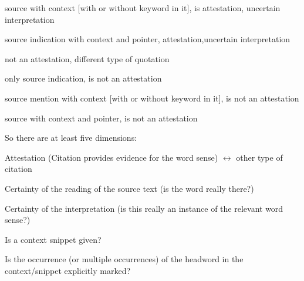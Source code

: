 \documentclass[10pt]{article}
\let\tempeone\enumerate
\let\tempetwo\endenumerate
\renewenvironment{enumerate}{\tempeone\setlength\itemsep{-0.5pt}\setlength{\partopsep}{-0.5pt}\setlength{\parsep}{-0.5pt}\setlength{\topsep}{-0.5pt}}{\tempetwo}
\begin{document}
{\begin{enumerate}
\begin{enumerate}
	\item {\fontsize{10pt}{12.0pt}\selectfont source with context [with or without keyword in it], is attestation, uncertain interpretation\par}\par

	\item {\fontsize{10pt}{12.0pt}\selectfont source indication with context and pointer, attestation,uncertain interpretation\par}\par


\end{enumerate}
	\item {\fontsize{10pt}{12.0pt}\selectfont not an attestation, different type of quotation\par}\par

\begin{enumerate}
	\item {\fontsize{10pt}{12.0pt}\selectfont only source indication, is not an attestation\par}\par

	\item {\fontsize{10pt}{12.0pt}\selectfont source mention with context [with or without keyword in it], is not an attestation\par}\par

	\item {\fontsize{10pt}{12.0pt}\selectfont [theoretically] source with context and pointer, is not an attestation\par}
\end{enumerate}
\end{enumerate}
}



\bigskip
\begin{minipage}{\textwidth}

So there are at least five dimensions:\par


\begin{enumerate}
	\item Attestation (Citation provides evidence for the word sense) $ \leftrightarrow $   other type of citation

	\item  Certainty of the reading of the source text (is the word really there?)

	\item Certainty of the interpretation (is this really an instance of the relevant word sense?)

	\item  Is a context snippet given?

    \item Is the occurrence (or multiple occurrences) of the headword in the context/snippet explicitly marked?
\end{enumerate}
\end{minipage}
\bigskip
\end{document}

